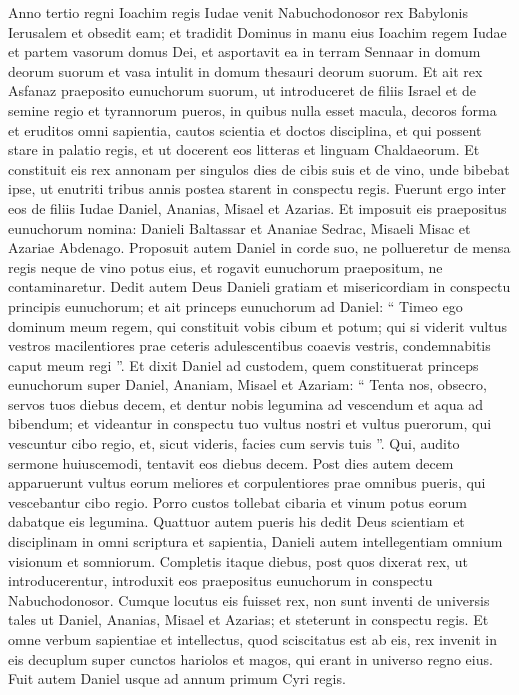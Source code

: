 \begin{biblechapter}
 \verse Anno tertio regni Ioachim regis Iudae venit Nabuchodonosor rex Babylonis Ierusalem et obsedit eam; 
\verse et tradidit Dominus in manu eius Ioachim regem Iudae et partem vasorum domus Dei, et asportavit ea in terram Sennaar in domum deorum suorum et vasa intulit in domum thesauri deorum suorum.
 \verse Et ait rex Asfanaz praeposito eunuchorum suorum, ut introduceret de filiis Israel et de semine regio et tyrannorum 
\verse pueros, in quibus nulla esset macula, decoros forma et eruditos omni sapientia, cautos scientia et doctos disciplina, et qui possent stare in palatio regis, et ut docerent eos litteras et linguam Chaldaeorum. 
\verse Et constituit eis rex annonam per singulos dies de cibis suis et de vino, unde bibebat ipse, ut enutriti tribus annis postea starent in conspectu regis. 
\verse Fuerunt ergo inter eos de filiis Iudae Daniel, Ananias, Misael et Azarias. 
\verse Et imposuit eis praepositus eunuchorum nomina: Danieli Baltassar et Ananiae Sedrac, Misaeli Misac et Azariae Abdenago.
 \verse Proposuit autem Daniel in corde suo, ne pollueretur de mensa regis neque de vino potus eius, et rogavit eunuchorum praepositum, ne contaminaretur. 
\verse Dedit autem Deus Danieli gratiam et misericordiam in conspectu principis eunuchorum; 
\verse et ait princeps eunuchorum ad Daniel: “ Timeo ego dominum meum regem, qui constituit vobis cibum et potum; qui si viderit vultus vestros macilentiores prae ceteris adulescentibus coaevis vestris, condemnabitis caput meum regi ”. 
\verse Et dixit Daniel ad custodem, quem constituerat princeps eunuchorum super Daniel, Ananiam, Misael et Azariam: 
\verse “ Tenta nos, obsecro, servos tuos diebus decem, et dentur nobis legumina ad vescendum et aqua ad bibendum; 
\verse et videantur in conspectu tuo vultus nostri et vultus puerorum, qui vescuntur cibo regio, et, sicut videris, facies cum servis tuis ”.
 \verse Qui, audito sermone huiuscemodi, tentavit eos diebus decem. 
\verse Post dies autem decem apparuerunt vultus eorum meliores et corpulentiores prae omnibus pueris, qui vescebantur cibo regio.
 \verse Porro custos tollebat cibaria et vinum potus eorum dabatque eis legumina.
 \verse Quattuor autem pueris his dedit Deus scientiam et disciplinam in omni scriptura et sapientia, Danieli autem intellegentiam omnium visionum et somniorum. 
\verse Completis itaque diebus, post quos dixerat rex, ut introducerentur, introduxit eos praepositus eunuchorum in conspectu Nabuchodonosor. 
\verse Cumque locutus eis fuisset rex, non sunt inventi de universis tales ut Daniel, Ananias, Misael et Azarias; et steterunt in conspectu regis. 
\verse Et omne verbum sapientiae et intellectus, quod sciscitatus est ab eis, rex invenit in eis decuplum super cunctos hariolos et magos, qui erant in universo regno eius. 
\verse Fuit autem Daniel usque ad annum primum Cyri regis.
 

\end{biblechapter}
